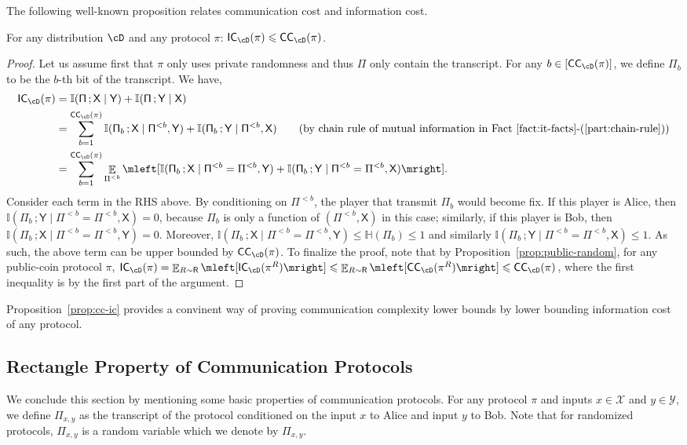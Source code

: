 \documentclass[11pt,letterpaper]{article}
\DeclareMathOperator*{\E}{\mathbb{E}}
\renewcommand{\leq}{\leqslant}
\theoremstyle{definition}
\newcommand{\bracket}[1]{\mleft[#1\mright]}
\newcommand{\Prot}{\ensuremath{\Pi}}
\newcommand{\prot}{\ensuremath{\pi}}
\newcommand{\rX}{\rv{X}}
\newcommand{\rY}{\rv{Y}}
\newcommand{\rv}[1]{\ensuremath{\mathsf{#1}}}
\newcommand{\II}{\ensuremath{\mathbb{I}}}
\newcommand{\HH}{\ensuremath{\mathbb{H}}}
\newcommand{\mi}[2]{\ensuremath{\II(#1 \,; #2)}}
\newcommand{\en}[1]{\ensuremath{\HH(#1)}}
\newcommand{\itfacts}[1]{Fact~\ref{fact:it-facts}-(\ref{part:#1})\xspace}
\newcommand{\rProt}{\rv{\Prot}}
\newcommand{\rR}{\rv{R}}
\newcommand{\CC}[2]{\ensuremath{\textnormal{\textsf{CC}}_{#2}(#1)}\xspace}
\newcommand{\ICost}[2]{\ensuremath{\textnormal{\textsf{IC}}_{#2}(#1)}\xspace}
\begin{document}
The following well-known proposition relates communication cost and information cost. 
\begin{proposition}\label{prop:cc-ic}
  For any distribution $\cD$ and any protocol $\prot$: $\ICost{\prot}{\cD} \leq \CC{\prot}{\cD}$.
\end{proposition}
\begin{proof}
Let us assume first that $\prot$ only uses private randomness and thus $\rProt$ only contain the transcript.  
For any $b \in [\CC{\prot}{\cD}]$, we define $\Prot_b$ to be the $b$-th bit of the transcript. We have, 
\begin{align*}
	 \ICost{\prot}{\cD} &= \mi{\rProt}{\rX \mid \rY}+ \mi{\rProt }{\rY \mid \rX} \\
	 &= \sum_{b=1}^{\CC{\prot}{\cD}} \mi{\rProt_b}{\rX \mid \rProt^{<b},\rY} + \mi{\rProt_b}{\rY \mid \rProt^{<b},\rX} \tag{by chain rule of mutual information in \itfacts{chain-rule}}\\
	 &= \sum_{b=1}^{\CC{\prot}{\cD}} \E_{\Prot^{<b}}\bracket{\mi{\rProt_b}{\rX \mid \rProt^{<b} = \Prot^{<b},\rY} + \mi{\rProt_b}{\rY \mid \rProt^{<b}= \Prot^{<b},\rX}}.
\end{align*}
Consider each term in the RHS above. By conditioning on $\Prot^{<b}$, the player that transmit $\rProt_b$ would become fix. If this player is Alice, then $\mi{\rProt_b}{\rY \mid \rProt^{<b}= \Prot^{<b},\rX} = 0$, because
$\rProt_b$ is only a function of $(\rProt^{<b},\rX)$ in this case; similarly, if this player is Bob, then $\mi{\rProt_b}{\rX \mid \rProt^{<b}= \Prot^{<b},\rY} = 0$. Moreover, 
$\mi{\rProt_b}{\rX \mid \rProt^{<b} = \Prot^{<b},\rY} \leq \en{\rProt_b}  \leq 1$ and similarly $\mi{\rProt_b}{\rY \mid \rProt^{<b}= \Prot^{<b},\rX} \leq 1$. As such, the above term can be upper bounded 
by $\CC{\prot}{\cD}$. To finalize the proof, note that by Proposition~\ref{prop:public-random}, for any public-coin protocol $\prot$, $\ICost{\prot}{\cD} = \E_{R \sim \rR}\bracket{\ICost{\prot^R}{\cD}} \leq \E_{R \sim \rR}\bracket{\CC{\prot^R}{\cD}} \leq \CC{\prot}{\cD}$, where
the first inequality is by the first part of the argument.  
\end{proof}

Proposition~\ref{prop:cc-ic} provides a convinent way of proving communication complexity lower bounds by lower bounding information cost of any protocol. 


\subsection*{Rectangle Property of Communication Protocols}\label{sec:statstics}
We conclude this section by mentioning some basic properties of communication protocols. For any protocol $\prot$ and inputs $x \in \mathcal{X}$ and $y \in \mathcal{Y}$, we define $\Prot_{x,y}$ as the transcript
of the protocol conditioned on the input $x$ to Alice and input $y$ to Bob. Note that for randomized protocols, $\Prot_{x,y}$ is a random variable which we denote by $\rProt_{x,y}$. 
\end{document}
